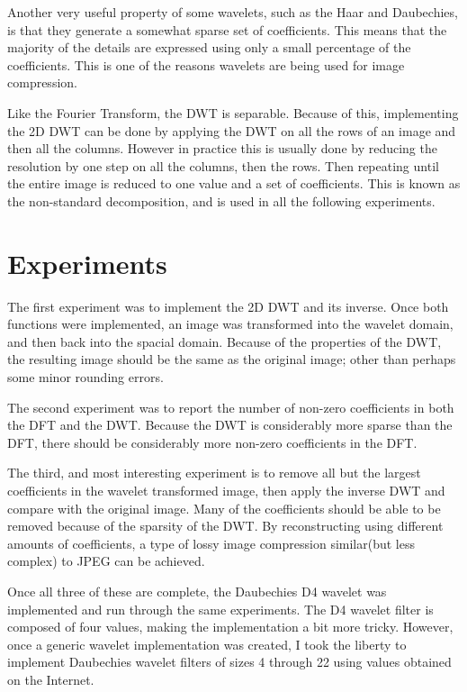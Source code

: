 Another very useful property of some wavelets, such as the Haar and Daubechies, is that they generate a somewhat sparse set of coefficients.  This means that the majority of the details are expressed using only a small percentage of the coefficients.  This is one of the reasons wavelets are being used for image compression.

Like the Fourier Transform, the DWT is separable.  Because of this, implementing the 2D DWT can be done by applying the DWT on all the rows of an image and then all the columns.  However in practice this is usually done by reducing the resolution by one step on all the columns, then the rows.  Then repeating until the entire image is reduced to one value and a set of coefficients.  This is known as the non-standard decomposition, and is used in all the following experiments.

\section{Experiments}

The first experiment was to implement the 2D DWT and its inverse.  Once both functions were implemented, an image was transformed into the wavelet domain, and then back into the spacial domain.  Because of the properties of the DWT, the resulting image should be the same as the original image; other than perhaps some minor rounding errors.

The second experiment was to report the number of non-zero coefficients in both the DFT and the DWT.  Because the DWT is considerably more sparse than the DFT, there should be considerably more non-zero coefficients in the DFT. 

The third, and most interesting experiment is to remove all but the largest coefficients in the wavelet transformed image, then apply the inverse DWT and compare with the original image.  Many of the coefficients should be able to be removed because of the sparsity of the DWT.  By reconstructing using different amounts of coefficients, a type of lossy image compression similar(but less complex) to   JPEG can be achieved.

Once all three of these are complete, the Daubechies D4 wavelet was implemented and run through the same experiments.  The D4 wavelet filter is composed of four values, making the implementation a bit more tricky.  However, once a generic wavelet implementation was created, I took the liberty to implement Daubechies wavelet filters of sizes 4 through 22 using values obtained on the Internet.

